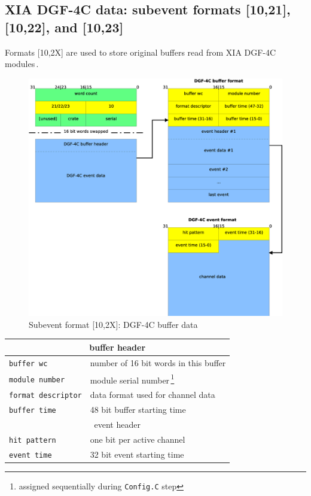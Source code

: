 \documentclass[10pt]{article}
\begin{document}
\subsection{XIA DGF-4C data: subevent formats [10,21], [10,22], and [10,23]}
Formats [10,2X] are used to store original buffers read from XIA DGF-4C modules\,\cite{XIAManuals}.
\begin{figure}[H]
\centerline{\includegraphics[width=\linewidth]{MedSevt_DGF}}
\caption{Subevent format [10,2X]: DGF-4C buffer data}
\label{MedSevt_DGF}
\end{figure}
\begin{minipage}{\linewidth}
\begin{table}[H]
\begin{center}
\begin{tabular}{ll}
\hline
\multicolumn{2}{c}{buffer header} \\
\hline
\verb+buffer wc+ & number of 16 bit words in this buffer \\
\verb+module number+ & module serial number\,\footnote{assigned sequentially during \texttt{Config.C} step} \\
\verb+format descriptor+ & data format used for channel data \\
\verb+buffer time+ & 48 bit buffer starting time \\
\hline
\multicolumn{2}{c}{event header} \\
\hline
\verb+hit pattern+ & one bit per active channel \\
\verb+event time+ & 32 bit event starting time \\
\hline
\end{tabular}
\end{center}
\label{MedSevt_DGF_Legend}
\end{table}
\end{minipage}
\end{document}
